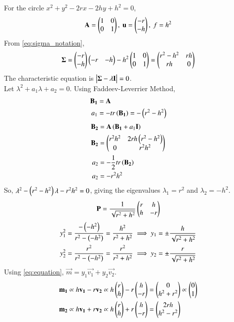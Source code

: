 \documentclass[journal]{IEEEtran}
\begin{document}
For the circle $x^2+y^2-2rx-2hy+h^2=0$,
\begin{align}
    \mathbf{A} = \begin{pmatrix}1 & 0 \\ 0 & 1\end{pmatrix},\text{ }\mathbf{u} = \begin{pmatrix}-r \\ -h\end{pmatrix},\text{ }f = h^2
\end{align}
From \eqref{eq:sigma_notation},
\begin{align}
    \mathbf{\Sigma} = \begin{pmatrix}-r \\ -h\end{pmatrix}\begin{pmatrix}-r & -h\end{pmatrix} - h^2\begin{pmatrix}1 & 0 \\ 0 & 1\end{pmatrix} = \begin{pmatrix}r^2-h^2 & rh \\ rh & 0\end{pmatrix}
\end{align}
The characteristic equation is $\begin{vmatrix}\mathbf{\Sigma}-\lambda\mathbf{I}\end{vmatrix}=0$. \\
Let $\lambda^2 + a_1 \lambda + a_2 = 0$. Using Faddeev-Leverrier Method,
\begin{align}
    \mathbf{B_1} &= \mathbf{A} \\
    a_1 &= - tr\left(\mathbf{B_1}\right) = -\left(r^2-h^2\right)
\end{align}
\begin{align}
    \mathbf{B_2} &= \mathbf{A}\left(\mathbf{B_1} + a_1\mathbf{I}\right) \\
    \mathbf{B_2} &= \begin{pmatrix}r^2h^2 & 2rh\left(r^2-h^2\right) \\ 0 & r^2h^2\end{pmatrix} \\
    a_2 &= -\frac{1}{2}tr\left(\mathbf{B_2}\right) \\
    a_2 &= -r^2h^2
\end{align}
So, $\lambda^2 - \left(r^2-h^2\right)\lambda - r^2h^2 = 0$, giving the eigenvalues $\lambda_1 = r^2$ and $\lambda_2 = -h^2$.
\begin{align}
    \mathbf{P} = \frac{1}{\sqrt{r^2+h^2}}\begin{pmatrix}r & h \\ h & -r\end{pmatrix}
\end{align}
\begin{align}
    y_1^2 = \frac{-\left(-h^2\right)}{r^2-\left(-h^2\right)} = \frac{h^2}{r^2+h^2} \implies y_1 = \pm\frac{h}{\sqrt{r^2+h^2}} \\
    y_2^2 = \frac{r^2}{r^2-\left(-h^2\right)} = \frac{r^2}{r^2+h^2} \implies y_2 = \pm\frac{r}{\sqrt{r^2+h^2}}
\end{align}
Using \eqref{eq:equation}, $\vec{m} = y_1\vec{v_1}+y_2\vec{v_2}$.
\begin{align}
    \mathbf{m_1} &\propto h\mathbf{v_1} - r\mathbf{v_2} \propto h\begin{pmatrix}r \\ h\end{pmatrix} - r\begin{pmatrix}h \\ -r\end{pmatrix} = \begin{pmatrix}0 \\ h^2+r^2\end{pmatrix} \propto \begin{pmatrix}0 \\ 1\end{pmatrix} \\
    \mathbf{m_2} &\propto h\mathbf{v_1} + r\mathbf{v_2} \propto h\begin{pmatrix}r \\ h\end{pmatrix} + r\begin{pmatrix}h \\ -r\end{pmatrix} = \begin{pmatrix}2rh \\ h^2-r^2\end{pmatrix}
\end{align}
\end{document}
